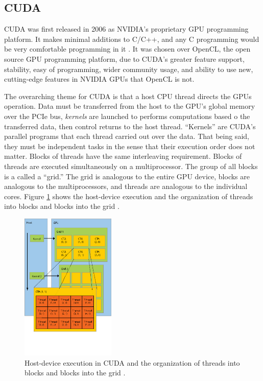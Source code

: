 \subsection{CUDA}

CUDA was first released in 2006 as NVIDIA's proprietary GPU programming platform.  It makes minimal additions to C/C++, and any C programming would be very comfortable programming in it \cite{cuda}.  It was chosen over OpenCL, the open source GPU programming platform, due to CUDA's greater feature support, stability, easy of programming, wider community usage, and ability to use new, cutting-edge features in NVIDIA GPUs that OpenCL is not.

The overarching theme for CUDA is that a host CPU thread directs the GPUs operation.  Data must be transferred from the host to the GPU's global memory over the PCIe bus, \emph{kernels} are launched to performs computations based o the transferred data, then control returns to the host thread.  ``Kernels'' are CUDA's parallel programs that each thread carried out over the data.  That being said, they must be independent tasks in the sense that their execution order does not matter.  Blocks of threads have the same interleaving requirement.  Blocks of threads are executed simultaneously on a multiprocessor.  The group of all blocks is a called a ``grid.''  The grid is analogous to the entire GPU device, blocks are analogous to the multiprocessors, and threads are analogous to the individual cores. Figure \ref{cuda_grid_launch} shows the host-device execution and the organization of threads into blocks and blocks into the grid \cite{cuda}.

\begin{figure}[h!] 
  \centering
    \includegraphics[width=0.4\textwidth,trim= 0cm 2.5cm 0cm 0cm]{graphics/CUDA_grid_launch.eps}
     \caption[Host-device execution in CUDA and the organization of threads into blocks and blocks into the grid.]{ Host-device execution in CUDA and the organization of threads into blocks and blocks into the grid \cite{cuda_ptx_isa}. \label{cuda_grid_launch}}
\end{figure}

